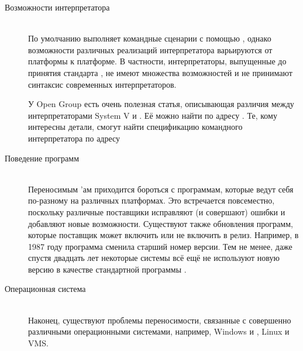 \begin{description}
\item[Возможности интерпретатора] \hfill \\
По умолчанию \GNUmake{} выполняет командные сценарии с помощью
, однако возможности различных реализаций
интерпретатора  варьируются от платформы к платформе. В
частности, интерпретаторы, выпущенные до принятия стандарта \POSIX{},
не имеют множества возможностей и не принимают синтаксис современных
интерпретаторов.

У Open Group есть очень полезная статья, описывающая различия между
интерпретаторами System V и \POSIX{}. Её можно найти по адресу
.
Те, кому интересны детали, смогут найти спецификацию командного
интерпретатора \POSIX{} по адресу

\item[Поведение программ] \hfill \\
Переносимым \Makefile{}'ам приходится бороться с программам, которые
ведут себя по-разному на различных платформах. Это встречается
повсеместно, поскольку различные поставщики исправляют (и совершают)
ошибки и добавляют новые возможности. Существуют также обновления
программ, которые поставщик может включить или не включить в релиз.
Например, в 1987 году программа  сменила старший номер
версии. Тем не менее, даже спустя двадцать лет некоторые системы всё
ещё не используют новую версию в качестве стандартной программы
.

\item[Операционная система] \hfill \\
Наконец, существуют проблемы переносимости, связанные с совершенно
различными операционными системами, например, Windows и \UNIX{}, Linux
и VMS.
\end{description}
